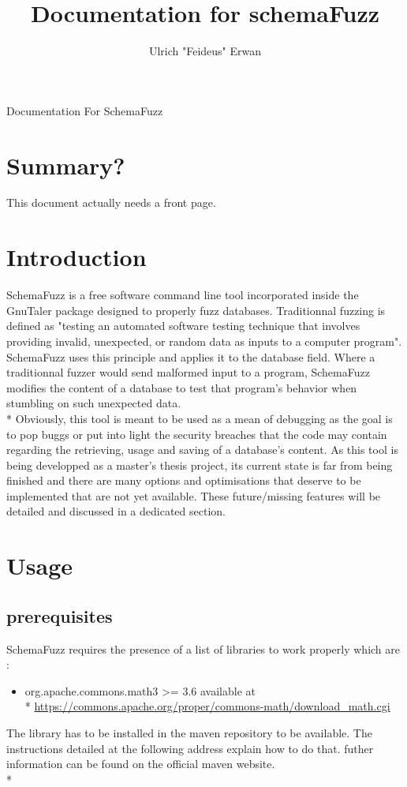 \documentclass{article}
\title{Documentation for schemaFuzz}
\author{Ulrich "Feideus" Erwan}
\begin{document}
	
\maketitle Documentation For SchemaFuzz
	\section{Summary?}
		This document actually needs a front page.
	\section{Introduction}
	
SchemaFuzz is a free software command line tool incorporated inside the GnuTaler package designed to properly fuzz databases.
Traditionnal fuzzing is defined as "testing an automated software testing technique that involves providing invalid, unexpected, or random data as inputs to a computer program". SchemaFuzz uses this principle and applies it to the database field.
Where a traditionnal fuzzer would send malformed input to a program, SchemaFuzz modifies the content of a database to test that program's behavior when stumbling on such unexpected data. \\*
Obviously, this tool is meant to be used as a mean of debugging as the goal is to pop buggs or put into light the security breaches that the code may contain regarding the retrieving, usage and saving of a database's content.
As this tool is being developped as a master's thesis project, its current state is far from being finished and there are many options and optimisations that deserve to be implemented that are not yet available.
These future/missing features will be detailed and discussed in a dedicated section.

	\section{Usage}
		\subsection{prerequisites}
			SchemaFuzz requires the presence of a list of libraries to work properly which are :
			\begin{itemize}
			\item org.apache.commons.math3 >= 3.6
			available at \\*
			\url{https://commons.apache.org/proper/commons-math/download_math.cgi}			
			\end{itemize}
The library has to be installed in the maven repository to be available. The instructions detailed at the following address explain how to do that. futher information can be found on the official maven website.\\*
\end{document}
